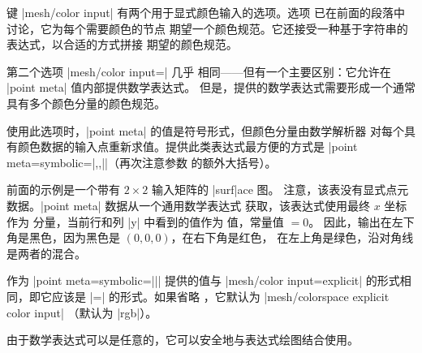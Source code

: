 {{键 |mesh/color input| 有两个用于显式颜色输入的选项。选项
 已在前面的段落中讨论，它为每个需要颜色的节点
期望一个颜色规范。它还接受一种基于字符串的表达式，以合适的方式拼接
期望的颜色规范。

第二个选项 |mesh/color input=| 几乎
相同——但有一个主要区别：它允许在 |point meta| 值内部提供数学表达式。
但是，提供的数学表达式需要形成一个通常具有多个颜色分量的颜色规范。

使用此选项时，|point meta| 的值是符号形式，但颜色分量由数学解析器
对每个具有颜色数据的输入点重新求值。提供此类表达式最方便的方式是
|point meta={symbolic={|,,|}}|（再次注意参数
的额外大括号）。

\begin{codeexample}[]
\end{codeexample}
%
\noindent 前面的示例是一个带有 $2 \times 2$ 输入矩阵的 |surf|ace 图。
注意，该表没有显式点元数据。|point meta| 数据从一个通用数学表达式
获取，该表达式使用最终 $x$ 坐标作为  分量，当前行和列
|y| 中看到的值作为  值，常量值 $=0$。
因此，输出在左下角是黑色，因为黑色是 $(0,0,0)$，在右下角是红色，
在左上角是绿色，沿对角线是两者的混合。

作为 |point meta={symbolic=||}| 提供的值与
|mesh/color input=explicit| 的形式相同，即它应该是
|=| 的形式。如果省略
，它默认为 |mesh/colorspace explicit color input|
（默认为 |rgb|）。

由于数学表达式可以是任意的，它可以安全地与表达式绘图结合使用。

}}
